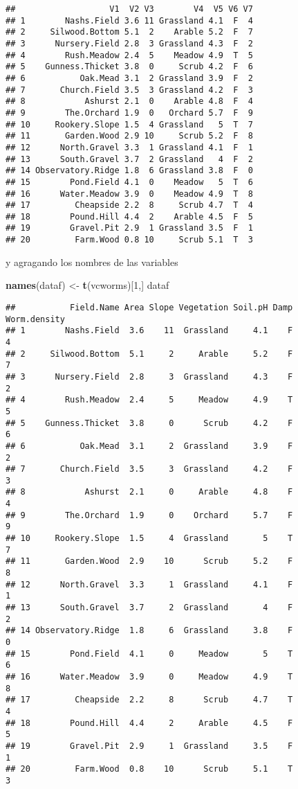 \documentclass[]{article}
\newenvironment{Shaded}{\begin{snugshade}}{\end{snugshade}}
\newcommand{\KeywordTok}[1]{\textcolor[rgb]{0.13,0.29,0.53}{\textbf{#1}}}
\newcommand{\DecValTok}[1]{\textcolor[rgb]{0.00,0.00,0.81}{#1}}
\newcommand{\StringTok}[1]{\textcolor[rgb]{0.31,0.60,0.02}{#1}}
\newcommand{\NormalTok}[1]{#1}
\begin{document}
\begin{verbatim}
##                   V1  V2 V3        V4  V5 V6 V7
## 1        Nashs.Field 3.6 11 Grassland 4.1  F  4
## 2     Silwood.Bottom 5.1  2    Arable 5.2  F  7
## 3      Nursery.Field 2.8  3 Grassland 4.3  F  2
## 4        Rush.Meadow 2.4  5    Meadow 4.9  T  5
## 5    Gunness.Thicket 3.8  0     Scrub 4.2  F  6
## 6           Oak.Mead 3.1  2 Grassland 3.9  F  2
## 7       Church.Field 3.5  3 Grassland 4.2  F  3
## 8            Ashurst 2.1  0    Arable 4.8  F  4
## 9        The.Orchard 1.9  0   Orchard 5.7  F  9
## 10     Rookery.Slope 1.5  4 Grassland   5  T  7
## 11       Garden.Wood 2.9 10     Scrub 5.2  F  8
## 12      North.Gravel 3.3  1 Grassland 4.1  F  1
## 13      South.Gravel 3.7  2 Grassland   4  F  2
## 14 Observatory.Ridge 1.8  6 Grassland 3.8  F  0
## 15        Pond.Field 4.1  0    Meadow   5  T  6
## 16      Water.Meadow 3.9  0    Meadow 4.9  T  8
## 17         Cheapside 2.2  8     Scrub 4.7  T  4
## 18        Pound.Hill 4.4  2    Arable 4.5  F  5
## 19        Gravel.Pit 2.9  1 Grassland 3.5  F  1
## 20         Farm.Wood 0.8 10     Scrub 5.1  T  3
\end{verbatim}

y agragando los nombres de las variables

\begin{Shaded}
\begin{Highlighting}[]
\KeywordTok{names}\NormalTok{(dataf) <-}\StringTok{ }\KeywordTok{t}\NormalTok{(vcworms)[}\DecValTok{1}\NormalTok{,]}
\NormalTok{dataf}
\end{Highlighting}
\end{Shaded}

\begin{verbatim}
##           Field.Name Area Slope Vegetation Soil.pH Damp Worm.density
## 1        Nashs.Field  3.6    11  Grassland     4.1    F            4
## 2     Silwood.Bottom  5.1     2     Arable     5.2    F            7
## 3      Nursery.Field  2.8     3  Grassland     4.3    F            2
## 4        Rush.Meadow  2.4     5     Meadow     4.9    T            5
## 5    Gunness.Thicket  3.8     0      Scrub     4.2    F            6
## 6           Oak.Mead  3.1     2  Grassland     3.9    F            2
## 7       Church.Field  3.5     3  Grassland     4.2    F            3
## 8            Ashurst  2.1     0     Arable     4.8    F            4
## 9        The.Orchard  1.9     0    Orchard     5.7    F            9
## 10     Rookery.Slope  1.5     4  Grassland       5    T            7
## 11       Garden.Wood  2.9    10      Scrub     5.2    F            8
## 12      North.Gravel  3.3     1  Grassland     4.1    F            1
## 13      South.Gravel  3.7     2  Grassland       4    F            2
## 14 Observatory.Ridge  1.8     6  Grassland     3.8    F            0
## 15        Pond.Field  4.1     0     Meadow       5    T            6
## 16      Water.Meadow  3.9     0     Meadow     4.9    T            8
## 17         Cheapside  2.2     8      Scrub     4.7    T            4
## 18        Pound.Hill  4.4     2     Arable     4.5    F            5
## 19        Gravel.Pit  2.9     1  Grassland     3.5    F            1
## 20         Farm.Wood  0.8    10      Scrub     5.1    T            3
\end{verbatim}
\end{document}

